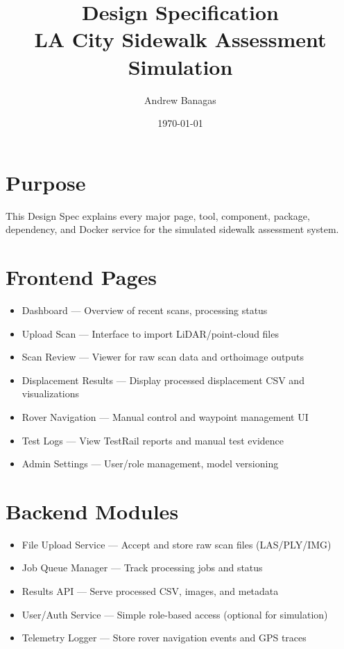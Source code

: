 \documentclass{article}
\title{Design Specification\\LA City Sidewalk Assessment Simulation}
\author{Andrew Banagas}
\date{\today}
\begin{document}
\maketitle
\tableofcontents
\newpage

\section{Purpose}
This Design Spec explains every major page, tool, component, package, dependency, and Docker service for the simulated sidewalk assessment system.

\section{Frontend Pages}
\begin{itemize}
  \item Dashboard — Overview of recent scans, processing status
  \item Upload Scan — Interface to import LiDAR/point-cloud files
  \item Scan Review — Viewer for raw scan data and orthoimage outputs
  \item Displacement Results — Display processed displacement CSV and visualizations
  \item Rover Navigation — Manual control and waypoint management UI
  \item Test Logs — View TestRail reports and manual test evidence
  \item Admin Settings — User/role management, model versioning
\end{itemize}

\section{Backend Modules}
\begin{itemize}
  \item File Upload Service — Accept and store raw scan files (LAS/PLY/IMG)
  \item Job Queue Manager — Track processing jobs and status
  \item Results API — Serve processed CSV, images, and metadata
  \item User/Auth Service — Simple role-based access (optional for simulation)
  \item Telemetry Logger — Store rover navigation events and GPS traces
\end{itemize}
\end{document}
